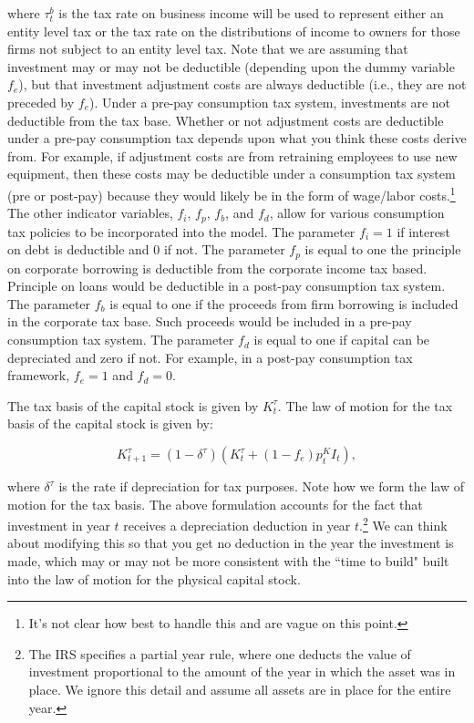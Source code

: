 \noindent\noindent  where $\tau^{b}_{t}$ is the tax rate on business income will be used to represent either an entity level tax or the tax rate on the distributions of income to owners for those firms not subject to an entity level tax.  Note that we are assuming that investment may or may not be deductible (depending upon the dummy variable $f_{e}$), but that investment adjustment costs are always deductible (i.e., they are not preceded by $f_{e}$).  Under a pre-pay consumption tax system, investments are not deductible from the tax base.  Whether or not adjustment costs are deductible under a pre-pay consumption tax depends upon what you think these costs derive from.  For example, if adjustment costs are from retraining employees to use new equipment, then these costs may be deductible under a consumption tax system (pre or post-pay) because they would likely be in the form of wage/labor costs.\footnote{It's not clear how best to handle this and \citet{DZ2013} are vague on this point.}  The other indicator variables, $f_{i}$, $f_{p}$, $f_{b}$, and $f_{d}$, allow for various consumption tax policies to be incorporated into the model.  The parameter $f_{i}=1$ if interest on debt is deductible and 0 if not.  The parameter $f_{p}$ is equal to one the principle on corporate borrowing is deductible from the corporate income tax based.  Principle on loans would be deductible in a post-pay consumption tax system.  The parameter $f_{b}$ is equal to one if the proceeds from firm borrowing is included in the corporate tax base.  Such proceeds would be included in a pre-pay consumption tax system.  The parameter $f_{d}$ is equal to one if capital can be depreciated and zero if not.  For example, in a post-pay consumption tax framework, $f_{e}=1$ and $f_{d}=0$.  

The tax basis of the capital stock is given by $K^{\tau}_{t}$.  The law of motion for the tax basis of the capital stock is given by:

\begin{equation}
\label{eqn:lom_taxcapital}
K^{\tau}_{t+1}=(1-\delta^{\tau})(K^{\tau}_{t} + (1-f_{e})p^{K}_{t}I_{t}),
\end{equation}

\noindent\noindent where $\delta^{\tau}$ is the rate if depreciation for tax purposes.  Note how we form the law of motion for the tax basis.  The above formulation accounts for the fact that investment in year $t$ receives a depreciation deduction in year $t$.\footnote{The IRS specifies a partial year rule, where one deducts the value of investment proportional to the amount of the year in which the asset was in place.  We ignore this detail and assume all assets are in place for the entire year.}  We can think about modifying this so that you get no deduction in the year the investment is made, which may or may not be more consistent with the ``time to build" built into the law of motion for the physical capital stock.

